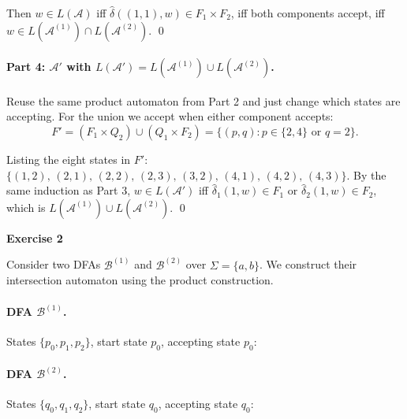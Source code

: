 \documentclass{article}
\theoremstyle{theorem}
\theoremstyle{definition}
\theoremstyle{remark}
\begin{document}
Then $w \in L(\mathcal{A})$ iff $\hat\delta((1,1), w) \in F_1 \times F_2$, iff both components accept, iff $w \in L(\mathcal{A}^{(1)}) \cap L(\mathcal{A}^{(2)})$. \qed

\paragraph{Part 4: $\mathcal{A}'$ with $L(\mathcal{A}') = L(\mathcal{A}^{(1)}) \cup L(\mathcal{A}^{(2)})$.}

Reuse the same product automaton from Part 2 and just change which states are accepting. For the union we accept when either component accepts:
\[
  F' = (F_1 \times Q_2) \cup (Q_1 \times F_2)
     = \{(p, q) : p \in \{2, 4\} \text{ or } q = 2\}.
\]

Listing the eight states in $F'$: $\{(1,2),\, (2,1),\, (2,2),\, (2,3),\, (3,2),\, (4,1),\, (4,2),\, (4,3)\}$. By the same induction as Part 3, $w \in L(\mathcal{A}')$ iff $\hat\delta_1(1, w) \in F_1$ or $\hat\delta_2(1, w) \in F_2$, which is $L(\mathcal{A}^{(1)}) \cup L(\mathcal{A}^{(2)})$. \qed

\bigskip

\textbf{Exercise 2}

Consider two DFAs $\mathcal{B}^{(1)}$ and $\mathcal{B}^{(2)}$ over $\Sigma = \{a, b\}$. We construct their intersection automaton using the product construction.

\paragraph{DFA $\mathcal{B}^{(1)}$.} States $\{p_0, p_1, p_2\}$, start state $p_0$, accepting state $p_0$:

\begin{center}
\end{center}

\paragraph{DFA $\mathcal{B}^{(2)}$.} States $\{q_0, q_1, q_2\}$, start state $q_0$, accepting state $q_0$:
\end{document}
